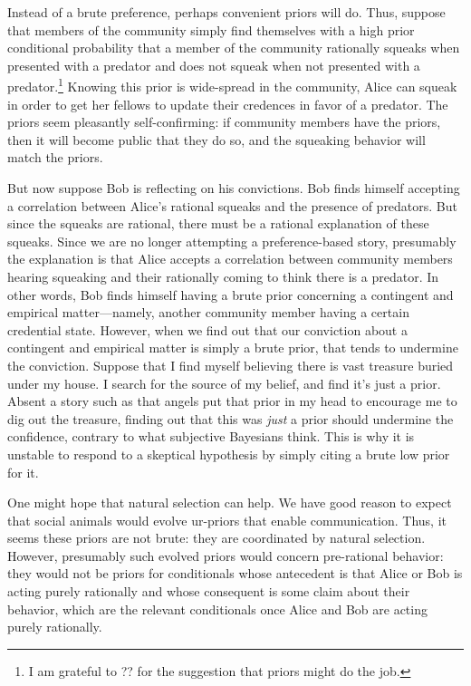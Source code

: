 Instead of a brute preference, perhaps convenient priors will do. Thus, suppose that members of the community simply find
themselves with a high prior conditional probability that a member of the community rationally squeaks when presented with a 
predator and does not squeak when not presented with a predator.\footnote{I am grateful to ?? for the suggestion that
priors might do the job.} Knowing this prior is wide-spread in the community, Alice can squeak in order to 
get her fellows to update their credences in favor of a predator. The priors seem pleasantly self-confirming: if community
members have the priors, then it will become public that they do so, and the squeaking behavior will match the priors.

But now suppose Bob is reflecting on his convictions. Bob finds himself accepting a correlation between Alice's rational 
squeaks and the presence of predators. But since the squeaks are rational, there must be a rational explanation of these 
squeaks. Since we are no longer attempting a preference-based story, presumably the explanation is that Alice accepts a 
correlation between community members hearing squeaking and their rationally coming to think there is a predator. In other
words, Bob finds himself having a brute prior concerning a contingent and empirical matter---namely, another community
member having a certain credential state.  However, when we find out that our conviction about a contingent and empirical 
matter is simply a brute prior, that tends to undermine the conviction. Suppose that I find myself believing there is vast treasure buried under my house. I search
for the source of my belief, and find it's just a prior. Absent a story such as that angels put that prior in my head
to encourage me to dig out the treasure, finding out that this was \textit{just} a prior should undermine the confidence,
contrary to what subjective Bayesians think. This is why it is unstable to respond to a skeptical hypothesis by simply
citing a brute low prior for it. 

One might hope that natural selection can help. We have good reason to expect that social animals would evolve
ur-priors that enable communication. Thus, it seems these priors are not brute: they are coordinated by natural selection.
However, presumably such evolved priors would concern pre-rational behavior: they would not be priors for 
conditionals whose antecedent is that Alice or Bob is acting purely rationally and whose consequent is some
claim about their behavior, which are the relevant conditionals once Alice and Bob are acting purely rationally.

